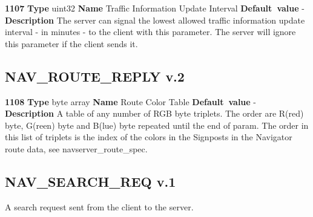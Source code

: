 \documentclass[a4paper]{article}
\begin{document}
\begin{list}{\textbf{ParamID}}{}
\item \textbf{1107} \textbf{Type} uint32 
       \textbf{Name} Traffic Information Update Interval
                 \textbf{Default~value} - \\
  \label{Traffic Information Update Interval}
  \textbf{Description} The server can signal the lowest allowed
  traffic information update interval - in minutes - to the client
  with this parameter. The server will ignore this parameter if the
  client sends it.

\end{list}

\subsection{NAV\_ROUTE\_REPLY v.2}

\begin{list}{\textbf{ParamID}}{}
\item \textbf{1108} \textbf{Type} byte array
       \textbf{Name} Route Color Table
                 \textbf{Default~value} - \\
  \label{Route Color Table}
  \textbf{Description} A table of any number of RGB byte triplets.
  The order are R(red) byte, G(reen) byte and B(lue) byte repeated until
  the end of param. The order in this list of triplets is the index of the
  colors in the Signposts in the Navigator route data, see 
  navserver\_route\_spec.
\end{list}



\subsection{NAV\_SEARCH\_REQ v.1}

A search request sent from the client to the server.
\end{document}
